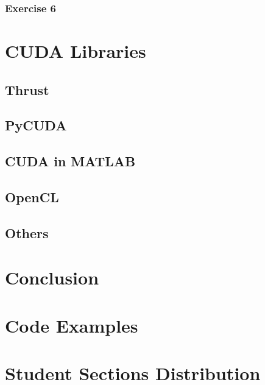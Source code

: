 \documentclass[12px,oz]{report}
\theoremstyle{indented}
\theoremstyle{indented}
\begin{document}
		\subsection{Exercise 6}
		\label{sec:exercise6}
		
		
\chapter{CUDA Libraries}
\label{ch-libraries}


	\section{Thrust}
	\label{sec-thrust}
	
	
	\section{PyCUDA}
	\label{sec-pycuda}
	
	
	\section{CUDA in MATLAB}
	\label{sec-matlab}
	
	
	\section{OpenCL}
	\label{sec-opencl}
	
	
	\section{Others}
	\label{sec-others}
	

\chapter{Conclusion}
\label{ch:conclusion}






\newpage
\appendix


\newpage
\chapter{Code Examples}
\label{ch:app_code_examples}

\newpage
\chapter{Student Sections Distribution}
\label{ch:app_stu_sec_dist}

\end{document}
